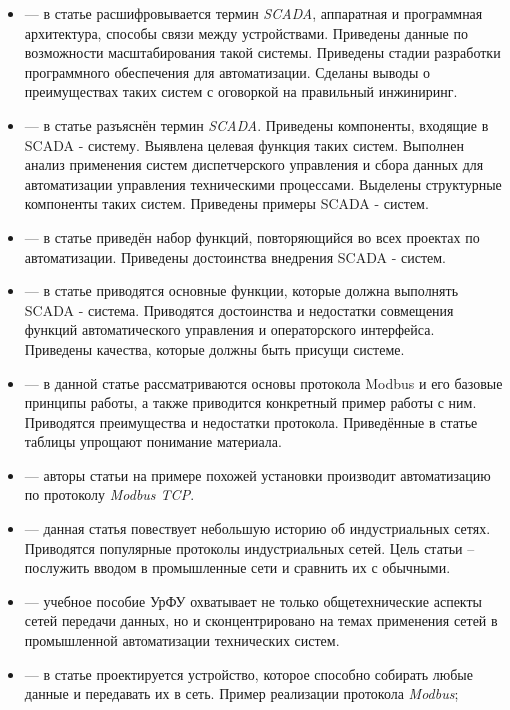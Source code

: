 \begin{itemize}[label=]
	\item \cite{daneels_what_1999} --- в статье расшифровывается термин \textit{SCADA}, аппаратная и программная архитектура, способы связи между устройствами. Приведены данные по возможности масштабирования такой системы. Приведены стадии разработки программного обеспечения для автоматизации. Сделаны выводы о преимуществах таких систем с оговоркой на правильный инжиниринг.
	\item \cite{__2019} --- в статье разъяснён термин \textit{SCADA}. Приведены компоненты, входящие в SCADA - систему. Выявлена целевая функция таких систем. Выполнен анализ применения систем диспетчерского управления и сбора данных для автоматизации управления техническими процессами. Выделены структурные компоненты таких систем. Приведены примеры \newline SCADA - систем. 
	\item \cite{__2013-1} --- в статье приведён набор функций, повторяющийся во всех проектах по автоматизации. Приведены достоинства внедрения SCADA - систем. 
	\item \cite{__1998} --- в статье приводятся основные функции, которые должна выполнять SCADA - система. Приводятся достоинства и недостатки совмещения функций автоматического управления и операторского интерфейса. Приведены качества, которые должны быть присущи системе.
	\item \cite{__2013} ---  в данной статье рассматриваются основы протокола Modbus и его базовые принципы работы, а также приводится конкретный пример работы с ним. Приводятся преимущества и недостатки протокола. Приведённые в статье таблицы упрощают понимание материала. 
	\item \cite{__2017} --- авторы статьи на примере похожей установки производит автоматизацию по протоколу \textit{Modbus TCP}.
	\item \cite {galloway_introduction_2012} ---  данная статья повествует небольшую историю об индустриальных сетях. Приводятся популярные протоколы индустриальных сетей. Цель статьи -- послужить вводом в промышленные сети и сравнить их с обычными.
	\item \cite{__2020} --- учебное пособие УрФУ охватывает не только общетехнические аспекты сетей передачи данных, но и сконцентрировано на темах применения сетей в промышленной автоматизации технических систем.
	\item \cite{a_design_2020} --- в статье проектируется устройство, которое способно собирать любые данные и передавать их в сеть. Пример реализации протокола \textit{Mod\-bus};

\end{itemize}
